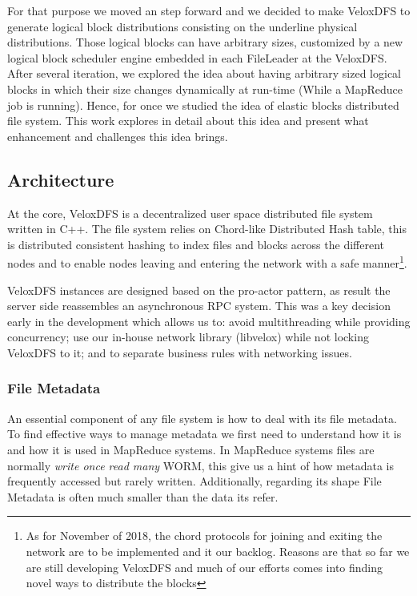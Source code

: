 For that purpose we moved an step forward and we decided to make VeloxDFS to generate logical block distributions consisting on the underline physical distributions. Those logical blocks can have arbitrary sizes, customized by a new logical block scheduler engine embedded in each FileLeader at the VeloxDFS. \\

After several iteration, we explored the idea about having arbitrary sized logical blocks in which their size changes dynamically at run-time (While a MapReduce job is running). Hence, for once we studied the idea of elastic blocks distributed file system. This work explores in detail about this idea and present what enhancement and challenges this idea brings.


\subsection{Architecture}
At the core, VeloxDFS is a decentralized user space distributed file system written in C++. The file system relies on Chord-like Distributed Hash table, this is distributed consistent hashing to index files and blocks across the different nodes and to enable nodes leaving and entering the network with a safe manner\footnote{As for November of 2018, the chord protocols for joining and exiting the network are to be implemented and it our backlog. Reasons are that so far we are still developing VeloxDFS and much of our efforts comes into finding novel ways to distribute the blocks}.

VeloxDFS instances are designed based on the pro-actor pattern, as result the server side reassembles an asynchronous RPC system. This was a key decision early in the development which allows us to: avoid multithreading while providing concurrency; use our in-house network library (libvelox) while not locking VeloxDFS to it; and to separate business rules with networking issues. \\

\subsubsection{File Metadata}
An essential component of any file system is how to deal with its file metadata. To find effective ways to manage metadata we first need to understand how it is and how it is used in MapReduce systems. In MapReduce systems files are normally \textit{write once read many} WORM, this give us a hint of how metadata is frequently accessed but rarely written. Additionally, regarding its shape File Metadata is often much smaller than the data its refer.\\ 

